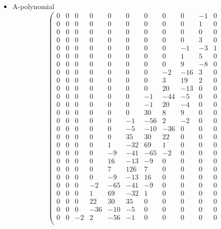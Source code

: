 \documentclass[12pt,reqno]{amsart}
\numberwithin{equation}{section}
\begin{document}
\begin{itemize}
\item A-polynomial
  \begin{equation*}
    \left(
      \begin{array}{ccccccccccc}
        0 & 0 & 0 & 0 & 0 & 0 & 0 & 0 & 0 & -1 & 0 \\
        0 & 0 & 0 & 0 & 0 & 0 & 0 & 0 & 0 & 1 & 0 \\
        0 & 0 & 0 & 0 & 0 & 0 & 0 & 0 & 0 & 0 & 0 \\
        0 & 0 & 0 & 0 & 0 & 0 & 0 & 0 & 0 & 3 & 0 \\
        0 & 0 & 0 & 0 & 0 & 0 & 0 & 0 & -1 & -3 & 1 \\
        0 & 0 & 0 & 0 & 0 & 0 & 0 & 0 & 1 & 5 & 0 \\
        0 & 0 & 0 & 0 & 0 & 0 & 0 & 0 & 9 & -8 & 0 \\
        0 & 0 & 0 & 0 & 0 & 0 & 0 & -2 & -16 & 3 & 0 \\
        0 & 0 & 0 & 0 & 0 & 0 & 0 & 3 & 19 & 2 & 0 \\
        0 & 0 & 0 & 0 & 0 & 0 & 0 & 20 & -13 & 0 & 0 \\
        0 & 0 & 0 & 0 & 0 & 0 & -1 & -44 & -5 & 0 & 0 \\
        0 & 0 & 0 & 0 & 0 & 0 & -1 & 20 & -4 & 0 & 0 \\
        0 & 0 & 0 & 0 & 0 & 0 & 30 & 8 & 9 & 0 & 0 \\
        0 & 0 & 0 & 0 & 0 & -1 & -56 & 2 & -2 & 0 & 0 \\
        0 & 0 & 0 & 0 & 0 & -5 & -10 & -36 & 0 & 0 & 0 \\
        0 & 0 & 0 & 0 & 0 & 35 & 30 & 22 & 0 & 0 & 0 \\
        0 & 0 & 0 & 0 & 1 & -32 & 69 & 1 & 0 & 0 & 0 \\
        0 & 0 & 0 & 0 & -9 & -41 & -65 & -2 & 0 & 0 & 0 \\
        0 & 0 & 0 & 0 & 16 & -13 & -9 & 0 & 0 & 0 & 0 \\
        0 & 0 & 0 & 0 & 7 & 126 & 7 & 0 & 0 & 0 & 0 \\
        0 & 0 & 0 & 0 & -9 & -13 & 16 & 0 & 0 & 0 & 0 \\
        0 & 0 & 0 & -2 & -65 & -41 & -9 & 0 & 0 & 0 & 0 \\
        0 & 0 & 0 & 1 & 69 & -32 & 1 & 0 & 0 & 0 & 0 \\
        0 & 0 & 0 & 22 & 30 & 35 & 0 & 0 & 0 & 0 & 0 \\
        0 & 0 & 0 & -36 & -10 & -5 & 0 & 0 & 0 & 0 & 0 \\
        0 & 0 & -2 & 2 & -56 & -1 & 0 & 0 & 0 & 0 & 0 \\

\end{array}
\end{equation*}
\end{itemize}
\end{document}
